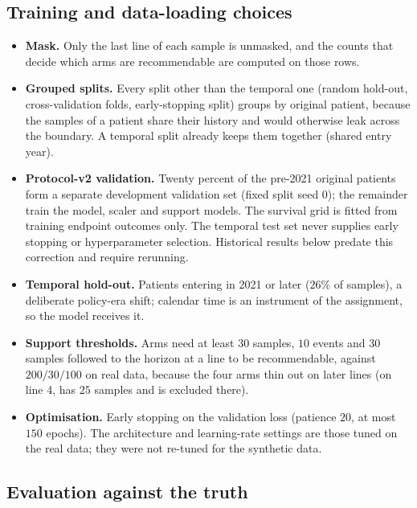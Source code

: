 \subsection{Training and data-loading choices}
\label{app:semisynthetic:training}

\begin{itemize}
    \item \textbf{Mask.} Only the last line of each sample is unmasked, and the counts that
    decide which arms are recommendable are computed on those rows.
    \item \textbf{Grouped splits.} Every split other than the temporal one (random hold-out,
    cross-validation folds, early-stopping split) groups by original patient, because the
    samples of a patient share their history and would otherwise leak across the boundary. A
    temporal split already keeps them together (shared entry year).
    \item \textbf{Protocol-v2 validation.} Twenty percent of the pre-2021 original patients
    form a separate development validation set (fixed split seed 0); the remainder train
    the model, scaler and support models. The survival grid is fitted from training endpoint
    outcomes only. The temporal test set never supplies early stopping or hyperparameter
    selection. Historical results below predate this correction and require rerunning.
    \item \textbf{Temporal hold-out.} Patients entering in 2021 or later ($26\%$ of samples),
    a deliberate policy-era shift; calendar time is an instrument of the assignment, so the
    model receives it.
    \item \textbf{Support thresholds.} Arms need at least $30$ samples, $10$ events and $30$
    samples followed to the horizon at a line to be recommendable, against $200/30/100$ on
    real data, because the four arms thin out on later lines (on line 4,  has
    $25$ samples and is excluded there).
    \item \textbf{Optimisation.} Early stopping on the validation loss (patience $20$, at most
    $150$ epochs). The architecture and learning-rate settings are those tuned on the real
    data; they were not re-tuned for the synthetic data.
\end{itemize}

\subsection{Evaluation against the truth}
\label{app:semisynthetic:evaluation}

